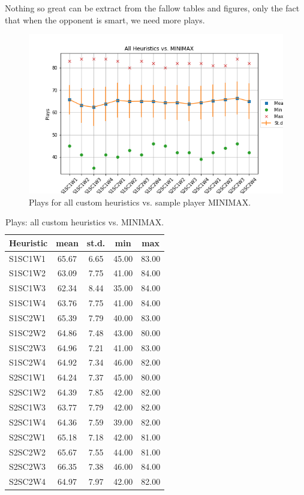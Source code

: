 \documentclass[a4paper]{article}
\begin{document}
Nothing so great can be extract from the fallow tables and figures, only the fact that when the opponent is smart, we need more plays.

\begin{figure}[htpb]
\begin{center}
\includegraphics[width=1\columnwidth]{fig/results_Plays_All_vs_MINIMAX.png}
\caption{Plays for all custom heuristics vs. sample player MINIMAX.}
\end{center}
\label{figplyesMINIMAX}
\end{figure}
    

    \begin{table}[htpb]
    \caption{ Plays: all custom heuristics vs. MINIMAX.}
    \centering
    \begin{tabular}{ l | c c c c }
    Heuristic & mean & st.d. & min & max \\ \hline 
    S1SC1W1 & 65.67 & 6.65 & 45.00 & 83.00 \\
    S1SC1W2 & 63.09 & 7.75 & 41.00 & 84.00 \\
    S1SC1W3 & 62.34 & 8.44 & 35.00 & 84.00 \\
    S1SC1W4 & 63.76 & 7.75 & 41.00 & 84.00 \\
    S1SC2W1 & 65.39 & 7.79 & 40.00 & 83.00 \\
    S1SC2W2 & 64.86 & 7.48 & 43.00 & 80.00 \\
    S1SC2W3 & 64.96 & 7.21 & 41.00 & 83.00 \\
    S1SC2W4 & 64.92 & 7.34 & 46.00 & 82.00 \\
    S2SC1W1 & 64.24 & 7.37 & 45.00 & 80.00 \\
    S2SC1W2 & 64.39 & 7.85 & 42.00 & 82.00 \\
    S2SC1W3 & 63.77 & 7.79 & 42.00 & 82.00 \\
    S2SC1W4 & 64.36 & 7.59 & 39.00 & 82.00 \\
    S2SC2W1 & 65.18 & 7.18 & 42.00 & 81.00 \\
    S2SC2W2 & 65.67 & 7.55 & 44.00 & 81.00 \\
    S2SC2W3 & 66.35 & 7.38 & 46.00 & 84.00 \\
    S2SC2W4 & 64.97 & 7.97 & 42.00 & 82.00 
    \end{tabular}
    \label{tabplaysMINIMAX}
    \end{table}
\end{document}
